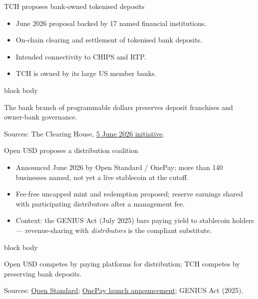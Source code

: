 \documentclass[aspectratio=169,12pt]{beamer}
\newcommand{\source}[1]{\vfill\par\fontsize{5.4}{6.5}\selectfont\color{Quiet}Sources: #1}
\newcommand{\tightitems}{\setlength{\itemsep}{0.42em}\setlength{\parskip}{0pt}}
\newenvironment{statement}{%
  \begin{beamercolorbox}[sep=.18cm,rounded=false,wd=\linewidth]{block body}%
  \fontsize{13}{15.5}\selectfont\bfseries
}{\end{beamercolorbox}}
\begin{document}
\begin{frame}{TCH proposes bank-owned tokenised deposits}
  \begin{itemize}\tightitems
    \item June 2026 proposal backed by 17 named financial institutions.
    \item On-chain clearing and settlement of tokenised bank deposits.
    \item Intended connectivity to CHIPS and RTP.
    \item TCH is owned by its large US member banks.
  \end{itemize}
  \begin{statement}
    The bank branch of programmable dollars preserves deposit franchises and owner-bank governance.
  \end{statement}
  \source{The Clearing House, \href{https://www.theclearinghouse.org/payment-systems/Articles/2026/06/Major-Financial-Institutions-Unveil-Bank-Led-On-Chain-Money-Initiative}{5 June 2026 initiative}.}
\end{frame}

\begin{frame}{Open USD proposes a distribution coalition}
  \begin{itemize}\tightitems
    \item Announced June 2026 by Open Standard / OnePay; more than 140 businesses named, not yet a live stablecoin at the cutoff.
    \item Fee-free uncapped mint and redemption proposed; reserve earnings shared with participating distributors after a management fee.
    \item Context: the GENIUS Act (July 2025) bars paying yield to stablecoin holders --- revenue-sharing with \emph{distributors} is the compliant substitute.
  \end{itemize}
  \begin{statement}
    Open USD competes by paying platforms for distribution; TCH competes by preserving bank deposits.
  \end{statement}
  \source{\href{https://joinopenstandard.com/}{Open Standard}; \href{https://www.onepay.com/newsroom/introducing-open-usd}{OnePay launch announcement}; GENIUS Act (2025).}
\end{frame}
\end{document}
